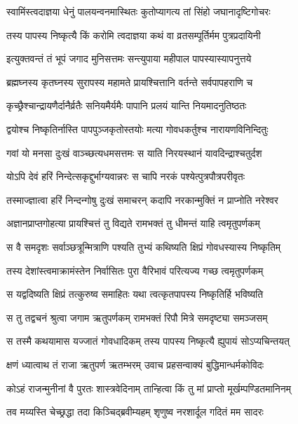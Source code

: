 \twolineshloka
{स्वामिंस्त्वदाज्ञया धेनुं पालयन्वनमास्थितः}
{कुतोप्यागत्य तां सिंहो जघानादृष्टिगोचरः}%

\twolineshloka
{तस्य पापस्य निष्कृत्यै किं करोमि त्वदाज्ञया}
{कथं वा व्रतसम्पूर्तिर्मम पुत्रप्रदायिनी}%

\twolineshloka
{इत्युक्तवन्तं तं भूपं जगाद मुनिसत्तमः}
{सन्त्युपाया महीपाल पापस्यास्यापनुत्तये}%

\twolineshloka
{ब्रह्मघ्नस्य कृतघ्नस्य सुरापस्य महामते}
{प्रायश्चित्तानि वर्तन्ते सर्वपापहराणि च}%

\twolineshloka
{कृच्छ्रैश्चान्द्रायणैर्दानैर्व्रतैः सनियमैर्यमैः}
{पापानि प्रलयं यान्ति नियमादनुतिष्ठतः}%

\twolineshloka
{द्वयोश्च निष्कृतिर्नास्ति पापपुञ्जकृतोस्तयोः}
{मत्या गोवधकर्तुश्च नारायणविनिन्दितुः}%

\twolineshloka
{गवां यो मनसा दुःखं वाञ्च्छत्यधमसत्तमः}
{स याति निरयस्थानं यावदिन्द्राश्चतुर्दश}%

\twolineshloka
{योऽपि देवं हरिं निन्देत्सकृद्दुर्भाग्यवान्नरः}
{स चापि नरकं पश्येत्पुत्रपौत्रपरीवृतः}%

\twolineshloka
{तस्माज्ज्ञात्वा हरिं निन्दन्गोषु दुःखं समाचरन्}
{कदापि नरकान्मुक्तिं न प्राप्नोति नरेश्वर}%

\twolineshloka
{अज्ञानप्राप्तगोहत्या प्रायश्चित्तं तु विद्यते}
{रामभक्तं तु धीमन्तं याहि त्वमृतुपर्णकम्}%

\twolineshloka
{स वै समदृशः सर्वाञ्छत्रून्मित्राणि पश्यति}
{तुभ्यं कथिष्यति क्षिप्रं गोवधस्यास्य निष्कृतिम्}%

\twolineshloka
{तस्य देशांस्त्वमाक्रामंस्तेन निर्वासितः पुरा}
{वैरिभावं परित्यज्य गच्छ त्वमृतुपर्णकम्}%

\twolineshloka
{स यद्वदिष्यति क्षिप्रं तत्कुरुष्व समाहितः}
{यथा त्वत्कृतपापस्य निष्कृतिर्हि भविष्यति}%

\twolineshloka
{स तु तद्वचनं श्रुत्वा जगाम ऋतुपर्णकम्}
{रामभक्तं रिपौ मित्रे समदृष्ट्या समञ्जसम्}%

\twolineshloka
{स तस्मै कथयामास यज्जातं गोवधादिकम्}
{तस्य पापस्य निष्कृत्यै ह्युपायं सोऽप्यचिन्तयत्}%

\twolineshloka
{क्षणं ध्यात्वाथ तं राजा ऋतुपर्ण ऋतम्भरम्}
{उवाच प्रहसन्वाक्यं बुद्धिमान्धर्मकोविदः}%

\twolineshloka
{कोऽहं राजन्मुनीनां वै पुरतः शास्त्रवेदिनाम्}
{तान्हित्वा किं तु मां प्राप्तो मूर्खम्पण्डितमानिनम्}%

\twolineshloka
{तव मय्यस्ति चेच्छ्रद्धा तदा किञ्चिद्ब्रवीम्यहम्}
{शृणुष्व नरशार्दूल गदितं मम सादरः}%

